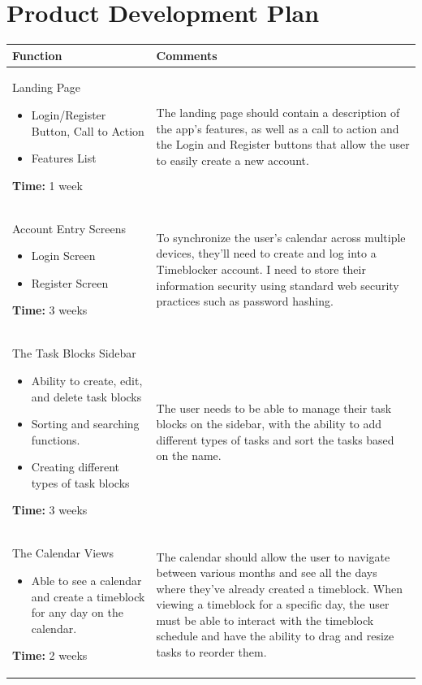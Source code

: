 \documentclass[12pt]{report}
\begin{document}
\section*{Product Development Plan}
\def\arraystretch{1.5}
\begin{xltabular}{\textwidth}{|X|X|}
	\hline
	Function
	& Comments
	\\\hline
	Landing Page
	\begin{itemize}
		\item Login/Register Button, Call to Action
		\item Features List
	\end{itemize}

	\medskip

	\textbf{Time:} 1 week
	&
	The landing page should contain a description of the app's features, as well as a call to action and the Login and Register buttons that allow the user to easily create a new account.
	\\\hline
	Account Entry Screens
	\begin{itemize}
		\item Login Screen
		\item Register Screen
	\end{itemize}
	\textbf{Time:} 3 weeks
	&
	To synchronize the user's calendar across multiple devices, they’ll need to create and log into a Timeblocker account. I need to store their information security using standard web security practices such as password hashing.
	\\\hline
	The Task Blocks Sidebar
	\begin{itemize}
		\item Ability to create, edit, and delete task blocks
		\item Sorting and searching functions.
		\item Creating different types of task blocks
	\end{itemize}
	\textbf{Time:} 3 weeks
	&
	The user needs to be able to manage their task blocks on the sidebar, with the ability to add different types of tasks and sort the tasks based on the name.
	\\\hline
	The Calendar Views
	\begin{itemize}
		\item Able to see a calendar and create a timeblock for any day on the calendar.
	\end{itemize}
	\textbf{Time:} 2 weeks
	&
	The calendar should allow the user to navigate between various months and see all the days where they've already created a timeblock. When viewing a timeblock for a specific day, the user must be able to interact with the timeblock schedule and have the ability to drag and resize tasks to reorder them.
	\\\hline
\end{xltabular}
\end{document}
